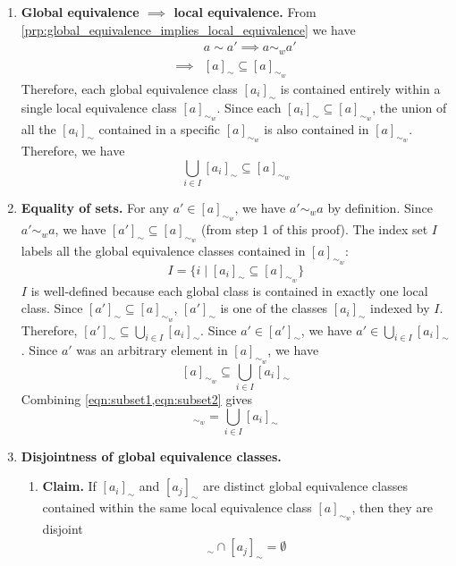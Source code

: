 \begin{proofE}
\begin{enumerate}[(1)]
    \item \textbf{Global equivalence $\implies$ local equivalence.}
    From \cref{prp:global_equivalence_implies_local_equivalence} we have
    \begin{align}
        & a \sim a' \implies a \sim_{w} a' \\
        \implies & [a]_{\sim} \subseteq [a]_{\sim_{w}}
    \end{align}
    Therefore, each global equivalence class $[a_{i}]_{\sim}$ is contained entirely within a single local equivalence class $[a]_{\sim_{w}}$.
    Since each $[a_{i}]_{\sim} \subseteq [a]_{\sim_{w}}$, the union of all the $[a_{i}]_{\sim}$ contained in a specific $[a]_{\sim_{w}}$ is also contained in $[a]_{\sim_{w}}$.
    Therefore, we have
    \begin{equation}\label{eqn:subset1}
        \bigcup_{i \in I}[a_{i}]_{\sim} \subseteq [a]_{\sim_{w}}
    \end{equation}

    \item \textbf{Equality of sets.}
    For any $a' \in [a]_{\sim_{w}}$, we have $a' \sim_{w} a$ by definition.
    Since $a' \sim_{w} a$, we have $[a']_{\sim} \subseteq [a]_{\sim_{w}}$ (from step 1 of this proof).
    The index set $I$ labels all the global equivalence classes contained in $[a]_{\sim_{w}}$:
    \begin{equation}
        I = \{ i \mid [a_{i}]_{\sim} \subseteq [a]_{\sim_{w}} \}
    \end{equation}
    $I$ is well-defined because each global class is contained in exactly one local class.
    Since $[a']_{\sim} \subseteq [a]_{\sim_{w}}$, $[a']_{\sim}$ is one of the classes $[a_{i}]_{\sim}$ indexed by $I$.
    Therefore, $[a']_{\sim} \subseteq \bigcup_{i \in I}[a_{i}]_{\sim}$.
    Since $a' \in [a']_{\sim}$, we have $a' \in \bigcup_{i \in I}[a_{i}]_{\sim}$.
    Since $a'$ was an arbitrary element in $[a]_{\sim_{w}}$, we have
    \begin{equation}\label{eqn:subset2}
        [a]_{\sim_{w}} \subseteq \bigcup_{i \in I}[a_{i}]_{\sim}
    \end{equation}
    Combining \cref{eqn:subset1,eqn:subset2} gives
    \begin{equation}
        [a]_{\sim_{w}} = \bigcup_{i \in I}[a_{i}]_{\sim}
    \end{equation}
    
    \item \textbf{Disjointness of global equivalence classes.}
    \begin{enumerate}
        \item \textbf{Claim.}
        If $[a_{i}]_{\sim}$ and $[a_{j}]_{\sim}$ are distinct global equivalence classes contained within the same local equivalence class $[a]_{\sim_{w}}$, then they are disjoint
        \begin{equation}
            [a_{i}]_{\sim} \cap [a_{j}]_{\sim} = \emptyset
        \end{equation}


\end{enumerate}
\end{enumerate}
\end{proofE}

